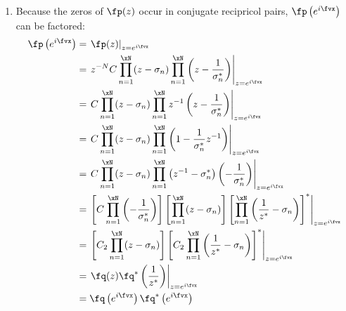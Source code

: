 \begin{proofns}
\begin{enumerate}
\item Because the zeros of $\fp(z)$ occur in conjugate recipricol pairs,
$\fp\left(e^{i\fvx}\right)$ can be factored:
\begin{align*}
  \fp\left(e^{i\fvx}\right)
    &= \left. \fp(z) \right|_{z=e^{i\fvx}}
  \\&= \left. z^{-N} C
         \prod_{n=1}^{\xN} (z-\sigma_n) 
         \prod_{n=1}^{\xN} \left( z - \frac{1}{\sigma_n^\ast} \right)
       \right|_{z=e^{i\fvx}}
  \\&= \left. C
         \prod_{n=1}^{\xN} (z-\sigma_n) 
         \prod_{n=1}^{\xN} z^{-1}\left( z - \frac{1}{\sigma_n^\ast} \right)
       \right|_{z=e^{i\fvx}}
  \\&= \left. C
         \prod_{n=1}^{\xN} (z-\sigma_n) 
         \prod_{n=1}^{\xN} \left( 1 - \frac{1}{\sigma_n^\ast} z^{-1}\right)
       \right|_{z=e^{i\fvx}}
  \\&= \left. C
         \prod_{n=1}^{\xN} (z-\sigma_n) 
         \prod_{n=1}^{\xN} \left( z^{-1}-\sigma_n^\ast \right)
                       \left(-\frac{1}{\sigma_n^\ast}\right)
       \right|_{z=e^{i\fvx}}
  \\&= \left. 
         \left[ C \prod_{n=1}^{\xN} \left(-\frac{1}{\sigma_n^\ast}\right)   \right]
         \left[ \prod_{n=1}^{\xN} (z-\sigma_n)                              \right]
         \left[ \prod_{n=1}^{\xN} \left( \frac{1}{z^\ast}-\sigma_n \right)       \right]^\ast
       \right|_{z=e^{i\fvx}}
  \\&= \left. 
         \left[ C_2 \prod_{n=1}^{\xN} (z-\sigma_n)                              \right]
         \left[ C_2 \prod_{n=1}^{\xN} \left( \frac{1}{z^\ast}-\sigma_n \right)       \right]^\ast
       \right|_{z=e^{i\fvx}}
  \\&= \left. \fq(z) \fq^\ast\left(\frac{1}{z^\ast}\right)
       \right|_{z=e^{i\fvx}}
  \\&= \fq\left(e^{i\fvx}\right)\fq^\ast\left(e^{i\fvx}\right)
\end{align*}

\end{enumerate}
\end{proofns}





